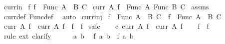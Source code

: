 \begin{isabellebody}
\isamarkupfalse%
\ curr{\isacharunderscore}{\kern0pt}in{\isacharcolon}{\kern0pt}\isanewline
{}\ f{\isacharcolon}{\kern0pt}\ {\isachardoublequoteopen}f\ {\isasymin}\ Func\ {\isacharparenleft}{\kern0pt}A\ {\isasymtimes}\ B{\isacharparenright}{\kern0pt}\ C{\isachardoublequoteclose}\isanewline
{}\ {\isachardoublequoteopen}curr\ A\ f\ {\isasymin}\ Func\ A\ {\isacharparenleft}{\kern0pt}Func\ B\ C{\isacharparenright}{\kern0pt}{\isachardoublequoteclose}\isanewline
%
\isadelimproof
%
\endisadelimproof
%
\isatagproof
{}\isamarkupfalse%
\ assms\ \isamarkupfalse%
\ curr{\isacharunderscore}{\kern0pt}def\ Func{\isacharunderscore}{\kern0pt}def\ \isamarkupfalse%
\ auto%
\endisatagproof
{\isafoldproof}%
%
\isadelimproof
\isanewline
%
\endisadelimproof
\isanewline
{}\isamarkupfalse%
\ curr{\isacharunderscore}{\kern0pt}inj{\isacharcolon}{\kern0pt}\isanewline
{}\ {\isachardoublequoteopen}f{}\ {\isasymin}\ Func\ {\isacharparenleft}{\kern0pt}A\ {\isasymtimes}\ B{\isacharparenright}{\kern0pt}\ C{\isachardoublequoteclose}\ \ {\isachardoublequoteopen}f{}\ {\isasymin}\ Func\ {\isacharparenleft}{\kern0pt}A\ {\isasymtimes}\ B{\isacharparenright}{\kern0pt}\ C{\isachardoublequoteclose}\isanewline
{}\ {\isachardoublequoteopen}curr\ A\ f{}\ {\isacharequal}{\kern0pt}\ curr\ A\ f{}\ {\isasymlongleftrightarrow}\ f{}\ {\isacharequal}{\kern0pt}\ f{}{\isachardoublequoteclose}\isanewline
%
\isadelimproof
%
\endisadelimproof
%
\isatagproof
{}\isamarkupfalse%
\ safe\isanewline
\ \ \isamarkupfalse%
\ c{\isacharcolon}{\kern0pt}\ {\isachardoublequoteopen}curr\ A\ f{}\ {\isacharequal}{\kern0pt}\ curr\ A\ f{}{\isachardoublequoteclose}\isanewline
\ \ \isamarkupfalse%
\ {\isachardoublequoteopen}f{}\ {\isacharequal}{\kern0pt}\ f{}{\isachardoublequoteclose}\isanewline
\ \ \isamarkupfalse%
\ {\isacharparenleft}{\kern0pt}rule\ ext{\isacharcomma}{\kern0pt}\ clarify{\isacharparenright}{\kern0pt}\isanewline
\ \ \ \ \isamarkupfalse%
\ a\ b\ \isamarkupfalse%
\ {\isachardoublequoteopen}f{}\ {\isacharparenleft}{\kern0pt}a{\isacharcomma}{\kern0pt}\ b{\isacharparenright}{\kern0pt}\ {\isacharequal}{\kern0pt}\ f{}\ {\isacharparenleft}{\kern0pt}a{\isacharcomma}{\kern0pt}\ b{\isacharparenright}{\kern0pt}{\isachardoublequoteclose}\isanewline

\end{isabellebody}
